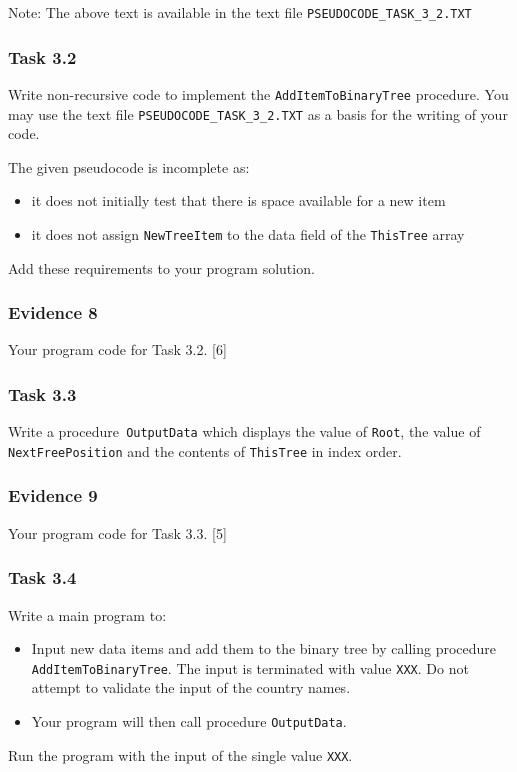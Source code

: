 Note: The above text is available in the text file \texttt{PSEUDOCODE\_TASK\_3\_2.TXT}

\subsubsection*{Task 3.2}

Write non-recursive code to implement the \texttt{AddItemToBinaryTree}
procedure. You may use the text file \texttt{PSEUDOCODE\_TASK\_3\_2.TXT}
as a basis for the writing of your code.

The given pseudocode is incomplete as:
\begin{itemize}
\item it does not initially test that there is space available for a new
item 
\item it does not assign \texttt{NewTreeItem} to the data field of the \texttt{ThisTree}
array
\end{itemize}
Add these requirements to your program solution.

\subsubsection*{Evidence 8}

Your program code for Task 3.2.\hfill{} {[}6{]}

\subsubsection*{Task 3.3}

Write a procedure\texttt{ OutputData} which displays the value of
\texttt{Root}, the value of \texttt{NextFreePosition} and the contents
of \texttt{ThisTree} in index order.

\subsubsection*{Evidence 9}

Your program code for Task 3.3. \hfill{}{[}5{]}

\subsubsection*{Task 3.4}

Write a main program to:
\begin{itemize}
\item Input new data items and add them to the binary tree by calling procedure
\texttt{AddItemToBinaryTree}. The input is terminated with value \textquotedbl\texttt{XXX}\textquotedbl .
Do not attempt to validate the input of the country names. 
\item Your program will then call procedure \texttt{OutputData}.
\end{itemize}
Run the program with the input of the single value \textquotedbl\texttt{XXX}\textquotedbl .

